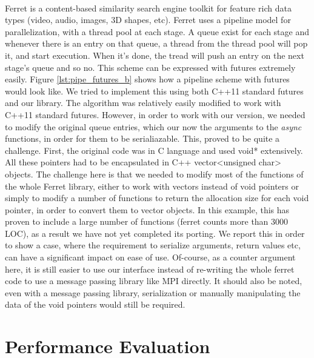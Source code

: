\paragraph{}
Ferret is a content-based similarity search engine toolkit for feature rich
data types (video, audio, images, 3D shapes, etc).
Ferret uses a pipeline model for parallelization, 
with a thread pool at each stage.  A queue exist for each stage and whenever
there is an entry on that queue, a thread from the thread pool will pop it, and start execution.  When it's
done, the tread will push an entry on the next stage's queue and so no.  This scheme can be expressed with
futures extremely easily.  Figure \ref{lst:pipe_futures_b} shows how a pipeline scheme with futures would 
look like.  We tried to implement this using both C++11 standard futures and our library.  The algorithm
was relatively easily modified to work with C++11 standard futures.  However, in order to work with our
version, we needed to modify the original queue entries, which our now the arguments to the \emph{async}
functions, in order for them to be serialiazable.  This, proved to be quite a challenge.  First, the original
code was in C language and used void* extensively.  All these pointers had to be encapsulated in 
C++ vector<unsigned char> objects.  The challenge here is that we needed to modify most of the functions
of the whole Ferret library, either to work with vectors instead of void pointers or simply to modify a 
number of functions to return the allocation size for each void pointer, in order to convert 
them to vector objects.  In this example, this has proven to include a large number of functions (ferret
counts more than 3000 LOC), as a result we have not yet completed its porting.  We report this in order
to show a case, where the requirement to serialize arguments, return values etc, can have a significant
impact on ease of use.  Of-course, as a counter argument here, it is still easier to 
use our interface instead of re-writing the whole ferret code to use a message passing library like MPI
directly.  It should also be noted, even with a message passing library, serialization or manually
manipulating the data of the void pointers would still be required.  

  
\section{Performance Evaluation}
\label{sect:eval_intro}
